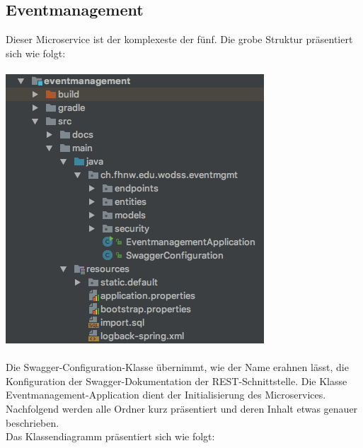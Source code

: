 \documentclass[11pt]{article} %
\begin{document}
\subsection{Eventmanagement}
Dieser Microservice ist der komplexeste der fünf. Die grobe Struktur präsentiert sich wie folgt:
\\
\\
\includegraphics[scale=0.7]{structure_eventmanagement}
\\
\\
Die Swagger-Configuration-Klasse übernimmt, wie der Name erahnen lässt, die Konfiguration der Swagger-Dokumentation der REST-Schnittstelle. Die Klasse Eventmanagement-Application dient der Initialisierung des Microservices. Nachfolgend werden alle Ordner kurz präsentiert und deren Inhalt etwas genauer beschrieben.
\\
Das Klassendiagramm präsentiert sich wie folgt:
\\
\\
\end{document}
